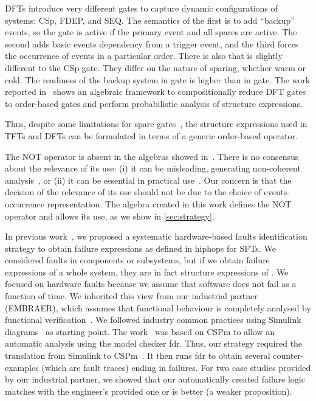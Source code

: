 \documentclass[en,twoside,onehalfspacing,phd]{risethesis}
\newcommand{\EMBRAER}{EMBRAER\xspace}
\newcommand{\simulink}{Simulink\xspace}
\begin{document}
\Acp{DFT} introduce very different gates to capture dynamic configurations of systems: \ac{CSp}, \ac{FDEP}, and \ac{SEQ}.
The semantics of the first is to add ``backup'' events, so the gate is active if the primary event and all spares are active.
The second adds basic events dependency from a trigger event, and the third forces the occurrence of events in a particular order.
There is also  that is slightly different to the \ac{CSp} gate.
They differ on the nature of sparing, whether warm or cold.
The readiness of the backup system in  gate is higher than in  gate.
The work reported in~\cite{MRL2011} shows an algebraic framework to compositionally reduce \ac{DFT} gates to order-based gates and perform probabilistic analysis of structure expressions.

Thus, despite some limitations for spare gates~\cite{MRL2014}, the structure expressions used in \acp{TFT} and \acp{DFT} can be formulated in terms of a generic order-based operator.

The NOT operator is absent in the algebras showed in~\cite{WP2009,Walker2009,Merle2010,MRL2011b}.
There is no consensus about the relevance of its use: (i) it can be misleading, generating non-coherent analysis~\cite{Oliv2006}, or (ii) it can be essential in practical use~\cite{Andrews2001}.
Our concern is that the decision of the relevance of its use should not be due to the choice of events-occurrence representation.
The algebra created in this work defines the NOT operator and allows its use, as we show in \cref{sec:strategy}.

In previous work~\cite{Didier2012,DM2012}, we proposed a systematic hardware-based faults identification strategy to obtain failure expressions as defined in \acs{hiphops} for \acp{SFT}.
We considered faults in components or subsystems, but if we obtain failure expressions of a whole system, they are in fact structure expressions of .
%
%
We focused on hardware faults because we assume that software does not fail as a function of time.
%
We inherited this view from our industrial partner (\EMBRAER), which assumes that functional behaviour is completely analysed by functional verification~\cite{SP2011}.
%
We followed industry common practices using \simulink diagrams~\cite{Nise1992} as starting point.
%
The work~\cite{DM2012} was based on \ac{CSPm} to allow an automatic analysis using the model checker \acs{fdr}.
%
Thus, our strategy required the translation from \simulink to \ac{CSPm}~\cite{JMS+2011}.
%
It then runs \acs{fdr} to obtain several counter-examples (which are fault traces) ending in failures.
%
For two case studies provided by our industrial partner, we showed that our automatically created failure logic matches with the engineer's provided one or is better (a weaker proposition).
\end{document}
